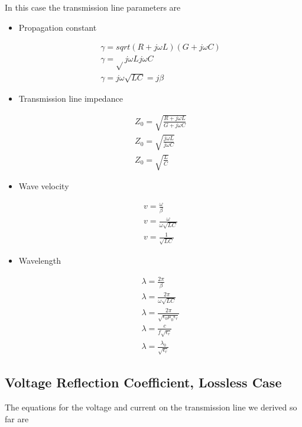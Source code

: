 In this case the transmission line parameters are
\begin{itemize}
\item Propagation constant


\begin{eqnarray}
\gamma =sqrt{(R+j\omega L)(G+ j\omega C)} \nonumber   \\ \nonumber
\gamma= \sqrt{}j \omega L j \omega C \\ \nonumber
\gamma = j \omega \sqrt{L C} = j \beta
\end{eqnarray}

\item Transmission line impedance 

\begin{eqnarray}
Z_0=\sqrt{\frac{R+j\omega L}{G+ j\omega C}} \nonumber  \\ \nonumber
Z_0=\sqrt{\frac{j\omega L}{ j\omega C}} \\ \nonumber
Z_0=\sqrt{\frac{L}{C}}
\end{eqnarray}

\item Wave velocity

\begin{eqnarray}
v=\frac{\omega}{\beta}  \nonumber \\ \nonumber
v=\frac{\omega}{\omega \sqrt{LC}} \\ \nonumber
v=\frac{1}{\sqrt{LC}}
\end{eqnarray}


\item Wavelength


\begin{eqnarray}
\lambda = \frac{2 \pi}{\beta}  \nonumber \\ \nonumber
\lambda = \frac{2 \pi}{ \omega \sqrt{LC}} \\ \nonumber
\lambda =\frac{2 \pi}{\sqrt{\epsilon_0 \mu_0 \epsilon_r} } \\ \nonumber
\lambda = \frac{c}{f \sqrt{\epsilon_r}} \\ \nonumber
\lambda = \frac{\lambda_0}{\sqrt{\epsilon_r}} \nonumber
\end{eqnarray}
\end{itemize}


\subsection{Voltage Reflection Coefficient, Lossless Case}

The equations for the voltage and current on the transmission line we
derived so far are


